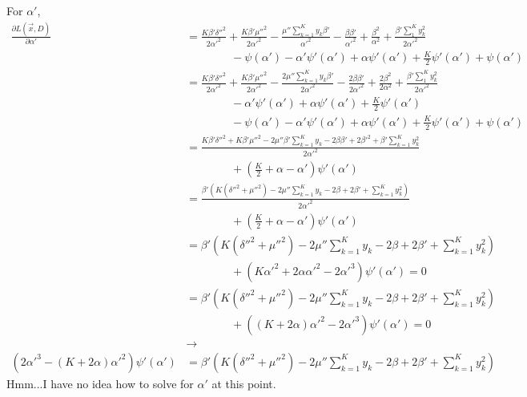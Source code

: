 \documentclass[12pt]{article}
\begin{document}
\begin{appendices}
For $\alpha'$,
\begin{align}
    \frac{\partial L(\vec{x}, D)}{\partial \alpha'} &=
    \frac{K\beta'\delta''^2}{2\alpha'^2} + \frac{K\beta'\mu''^2}{2\alpha'^2}
    - \frac{\mu''\sum_{k=1}^{K}y_{k}\beta'}{\alpha'^2}
    - \frac{\beta\beta'}{\alpha'^2} + \frac{\beta^2}{\alpha^2}
    + \frac{\beta'\sum_{1}^{K}y_{k}^2}{2\alpha'^2}
    \nonumber \\
    &\quad\quad\quad\quad
    - \psi(\alpha') - \alpha'\psi'(\alpha')
    + \alpha\psi'(\alpha') + \frac{K}{2}\psi'(\alpha')
    + \psi(\alpha')
    \nonumber \\
    &=
    \frac{K\beta'\delta''^2}{2\alpha'^2} + \frac{K\beta'\mu''^2}{2\alpha'^2}
    - \frac{2\mu''\sum_{k=1}^{K}y_{k}\beta'}{2\alpha'^2}
    - \frac{2\beta\beta'}{2\alpha'^2} + \frac{2\beta^2}{2\alpha^2}
    + \frac{\beta'\sum_{1}^{K}y_{k}^2}{2\alpha'^2}
    \nonumber \\
    &\quad\quad\quad\quad
    - \alpha'\psi'(\alpha')
    + \alpha\psi'(\alpha') + \frac{K}{2}\psi'(\alpha')
    \nonumber \\
    &\quad\quad\quad\quad
    - \psi(\alpha') - \alpha'\psi'(\alpha')
    + \alpha\psi'(\alpha') + \frac{K}{2}\psi'(\alpha')
    + \psi(\alpha')
    \nonumber \\
    &=
    \frac{K\beta'\delta''^2 + K\beta'\mu''^2
    - 2\mu''\beta'\sum_{k=1}^{K}y_{k}
    - 2\beta\beta' + 2\beta'^2
    + \beta'\sum_{k=1}^{K}y_{k}^2}{2\alpha'^2}
    \nonumber \\
    &\quad\quad\quad\quad
    + (\frac{K}{2} + \alpha - \alpha')\psi'(\alpha')
    \nonumber \\
    &=
    \frac{\beta'(K(\delta''^2 + \mu''^2)
    - 2\mu''\sum_{k=1}^{K}y_{k}
    - 2\beta + 2\beta'
    + \sum_{k=1}^{K}y_{k}^2)}{2\alpha'^2}
    \nonumber \\
    &\quad\quad\quad\quad
    + (\frac{K}{2} + \alpha - \alpha')\psi'(\alpha')
    \nonumber \\
    &=
    \beta'(K(\delta''^2 + \mu''^2)
    - 2\mu''\sum_{k=1}^{K}y_{k}
    - 2\beta + 2\beta'
    + \sum_{k=1}^{K}y_{k}^2)
    \nonumber \\
    &\quad\quad\quad\quad
    + (K\alpha'^2 + 2\alpha\alpha'^2 - 2\alpha'^3)\psi'(\alpha') = 0
    \nonumber \\
    &=
    \beta'(K(\delta''^2 + \mu''^2)
    - 2\mu''\sum_{k=1}^{K}y_{k}
    - 2\beta + 2\beta'
    + \sum_{k=1}^{K}y_{k}^2)
    \nonumber \\
    &\quad\quad\quad\quad
    + ((K + 2\alpha)\alpha'^2 - 2\alpha'^3)\psi'(\alpha') = 0
    \nonumber \\
    & \rightarrow
    \nonumber \\
    (2\alpha'^3 - (K + 2\alpha)\alpha'^2)\psi'(\alpha') &=
    \beta'(K(\delta''^2 + \mu''^2)
    - 2\mu''\sum_{k=1}^{K}y_{k}
    - 2\beta + 2\beta'
    + \sum_{k=1}^{K}y_{k}^2)
\end{align}
Hmm...I have no idea how to solve for $\alpha'$ at this point.


\end{appendices}
\end{document}
